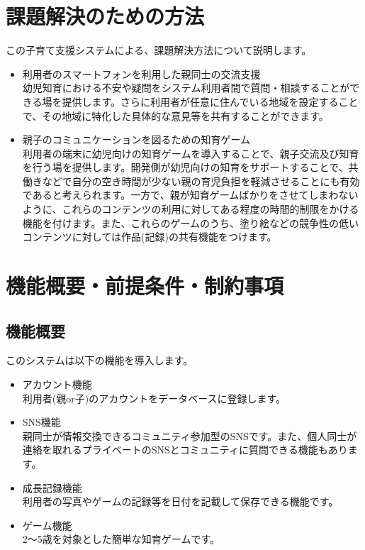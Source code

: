 \documentclass[a4j]{jarticle}
\begin{document}
\section{課題解決のための方法}
この子育て支援システムによる、課題解決方法について説明します。
\begin{itemize}
  \item 利用者のスマートフォンを利用した親同士の交流支援 ~\\
    幼児知育における不安や疑問をシステム利用者間で質問・相談することができる場を提供します。さらに利用者が任意に住んでいる地域を設定することで、その地域に特化した具体的な意見等を共有することができます。
  \item 親子のコミュニケーションを図るための知育ゲーム ~\\
    利用者の端末に幼児向けの知育ゲームを導入することで、親子交流及び知育を行う場を提供します。開発側が幼児向けの知育をサポートすることで、共働きなどで自分の空き時間が少ない親の育児負担を軽減させることにも有効であると考えられます。一方で、親が知育ゲームばかりをさせてしまわないように、これらのコンテンツの利用に対してある程度の時間的制限をかける機能を付けます。また、これらのゲームのうち、塗り絵などの競争性の低いコンテンツに対しては作品(記録)の共有機能をつけます。
\end{itemize}

\section{機能概要・前提条件・制約事項}

\subsection{機能概要}
このシステムは以下の機能を導入します。
\begin{itemize}
\item アカウント機能 ~\\
利用者(親or子)のアカウントをデータベースに登録します。
\item SNS機能 ~\\
親同士が情報交換できるコミュニティ参加型のSNSです。また、個人同士が連絡を取れるプライベートのSNSとコミュニティに質問できる機能もあります。
\item 成長記録機能 ~\\
利用者の写真やゲームの記録等を日付を記載して保存できる機能です。
\item ゲーム機能 ~\\
2～5歳を対象とした簡単な知育ゲームです。
\end{itemize}
\end{document}
